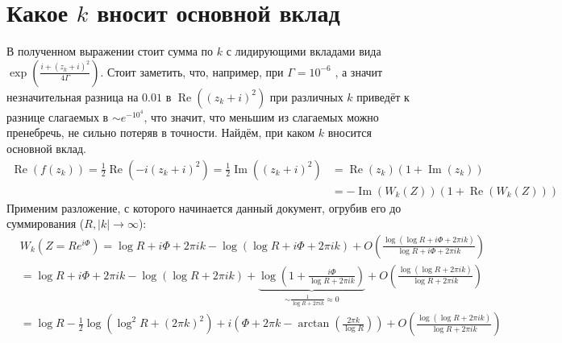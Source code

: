 \documentclass[a4paper, 12pt]{article}
\DeclareMathOperator*{\Real}{Re}
\DeclareMathOperator*{\Imag}{Im}
\begin{document}
\section*{Какое $k$ вносит основной вклад}
В полученном выражении стоит сумма по $k$ с лидирующими вкладами вида $\exp\left(\frac{i+(z_k+i)^2}{4\Gamma}\right)$. Стоит заметить, что, например, при $\Gamma = 10^{-6}$ , а значит незначительная разница на $0.01$ в $\Real\left((z_k+i)^2\right)$ при различных $k$ приведёт к разнице слагаемых в $\sim e^{-10^4}$, что значит, что меньшим из слагаемых можно пренебречь, не сильно потеряв в точности. Найдём, при каком $k$ вносится основной вклад. 
\begin{equation}
\begin{aligned}
    \Real\left(f(z_k)\right) = \frac{1}{2}\Real\left(-i(z_k+i)^2\right) = \frac{1}{2}\Imag\left((z_k+i)^2\right) 
    &= \Real\left(z_k\right)\left(1+\Imag(z_k)\right)\\
    &= -\Imag(W_k(Z))\left(1+\Real(W_k(Z))\right)
\end{aligned}
\end{equation}
Применим разложение, с которого начинается данный документ, огрубив его до суммирования ($R, |k| \rightarrow \infty$):
\begin{equation}
\begin{aligned}
    &W_k\left(Z=R e^{i\Phi}\right) = \log R + i\Phi + 2\pi i k - \log\left(\log R + i\Phi+ 2\pi i k\right) + O\left(\frac{\log\left(\log R + i\Phi+ 2\pi i k\right)}{\log R + i\Phi + 2\pi i k}\right)\\
    &= \log R + i\Phi + 2\pi i k - \log\left(\log R + 2\pi i k\right) + \underbrace{\log\left(1+\frac{i\Phi}{\log R +  2\pi i k}\right)}_{\sim \frac{1}{\log R  + 2\pi i k} \approx 0} + O\left(\frac{\log\left(\log R + 2\pi i k\right)}{\log R  + 2\pi i k}\right)\\
    &= \log R - \frac{1}{2}\log\left(\log^2 R + (2\pi k)^2\right) + 
    i\left(\Phi + 2\pi k - \arctan\left(\frac{2\pi k}{\log R}\right)\right) 
    + O\left(\frac{\log\left(\log R + 2\pi i k\right)}{\log R  + 2\pi i k}\right)
\end{aligned}
\end{equation}
\end{document}
